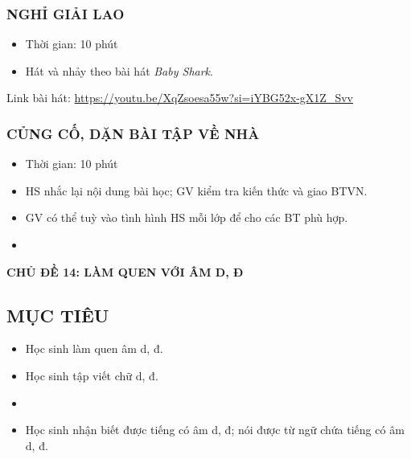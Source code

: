 \documentclass[../main.tex]{subfiles}
\begin{document}
\subsubsection{NGHỈ GIẢI LAO}
\begin{hd}
    \begin{itemize}\GAgon
        \item Thời gian: 10 phút
        \item Hát và nhảy theo bài hát \textit{Baby Shark}.
    \end{itemize}
\end{hd}
\noindent Link bài hát: \url{https://youtu.be/XqZsoesa55w?si=iYBG52x-gX1Z_Svv}

\newpage
\subsubsection{ CỦNG CỐ, DẶN BÀI TẬP VỀ NHÀ}
\begin{hd}
    \begin{itemize}\GAgon
        \item Thời gian: 10 phút
        \item HS nhắc lại nội dung bài học; GV kiểm tra kiến thức và giao BTVN.
    \end{itemize}
\end{hd}
\begin{itemize}\GAgon
    \item GV có thể tuỳ vào tình hình HS mỗi lớp để cho các BT phù hợp.
    \item {}

\end{itemize}

\newpage
\setcounter{subsection}{0}
\begin{center}
        {\color{mauchinh!120}\bfseries\Large CHỦ ĐỀ 14: LÀM QUEN VỚI ÂM D, Đ}\\[2pt]
\end{center}

\subsection{MỤC TIÊU}
\begin{itemize}\GAgon
    \item Học sinh làm quen âm d, đ.
    \item Học sinh tập viết chữ d, đ.
    \item {}
    \item Học sinh nhận biết được tiếng có âm d, đ; nói được từ ngữ chứa tiếng có âm d, đ.

\end{itemize}
\end{document}
